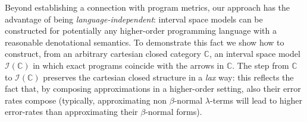 Beyond establishing a connection with program metrics, our approach has the advantage of being \emph{language-independent}: interval space models can be constructed for potentially any higher-order programming language with a reasonable denotational semantics. To demonstrate this fact we show how to construct, from an arbitrary cartesian closed category $\mathbb C$, an interval space model $\mathcal I(\mathbb C)$ in which exact programs coincide with the arrows in $\mathbb C$. The step from $\mathbb C$ to $\mathcal I(\mathbb C)$ preserves the cartesian closed structure in a \emph{lax} way: this reflects the fact that, by composing approximations in a higher-order setting, also their error rates compose (typically, approximating non $\beta$-normal $\lambda$-terms will lead to higher error-rates than approximating their $\beta$-normal forms). 


